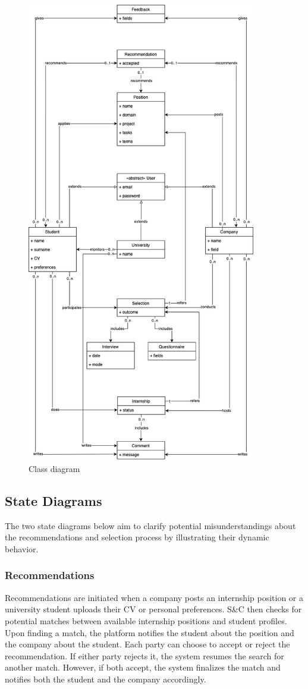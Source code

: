 \begin{figure}
    \centering
    \includegraphics[width=10cm]{images/class-diagram.png}
    \caption{Class diagram}
\end{figure}

\subsection{State Diagrams}
The two state diagrams below aim to clarify potential misunderstandings about the recommendations and selection process by illustrating their dynamic behavior.

\subsubsection{Recommendations}
Recommendations are initiated when a company posts an internship position or a university student uploads their CV or personal preferences.
S\&C then checks for potential matches between available internship positions and student profiles.
Upon finding a match, the platform notifies the student about the position and the company about the student.
Each party can choose to accept or reject the recommendation.
If either party rejects it, the system resumes the search for another match.
However, if both accept, the system finalizes the match and notifies both the student and the company accordingly.

